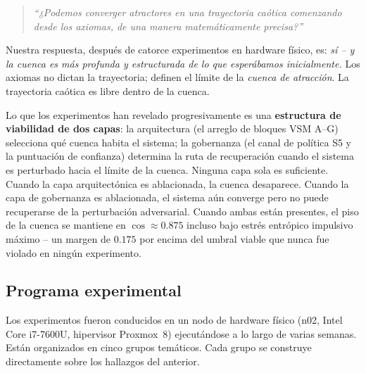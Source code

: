 \documentclass[11pt, a4paper]{article}
\begin{document}
\begin{quote}
\textit{``¿Podemos converger atractores en una trayectoria caótica comenzando desde
los axiomas, de una manera matemáticamente precisa?''}
\end{quote}

Nuestra respuesta, después de catorce experimentos en hardware físico, es:
\emph{sí -- y la cuenca es más profunda y estructurada de lo que esperábamos inicialmente.}
Los axiomas no dictan la trayectoria; definen el límite de la
\emph{cuenca de atracción}.
La trayectoria caótica es libre dentro de la cuenca.

Lo que los experimentos han revelado progresivamente es una \textbf{estructura
de viabilidad de dos capas}: la arquitectura (el arreglo de bloques VSM A--G)
selecciona qué cuenca habita el sistema; la gobernanza (el canal de política S5
y la puntuación de confianza) determina la ruta de recuperación cuando el sistema
es perturbado hacia el límite de la cuenca.
Ninguna capa sola es suficiente.
Cuando la capa arquitectónica es ablacionada, la cuenca desaparece.
Cuando la capa de gobernanza es ablacionada, el sistema aún converge pero no puede
recuperarse de la perturbación adversarial.
Cuando ambas están presentes, el piso de la cuenca se mantiene en $\cos \approx 0.875$
incluso bajo estrés entrópico impulsivo máximo -- un margen de $0.175$ por encima
del umbral viable que nunca fue violado en ningún experimento.

\subsection{Programa experimental}
\label{sec:programme}

Los experimentos fueron conducidos en un nodo de hardware físico (n02,
Intel Core i7-7600U, hipervisor Proxmox~8) ejecutándose a lo largo de varias semanas.
Están organizados en cinco grupos temáticos.
Cada grupo se construye directamente sobre los hallazgos del anterior.
\end{document}
